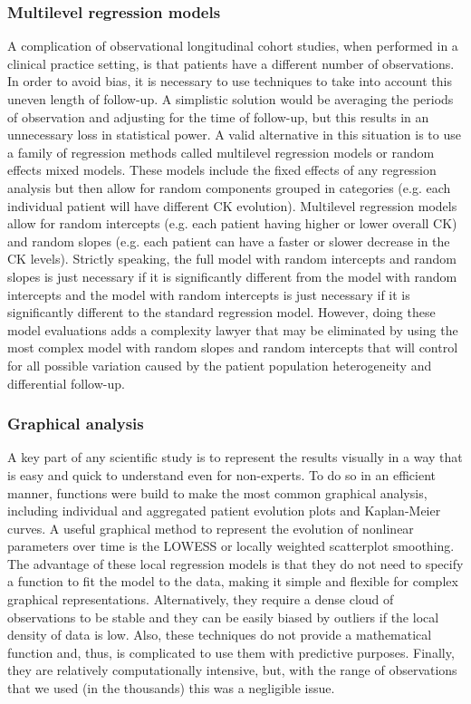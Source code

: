 \subsubsection{Multilevel regression models}
A complication of observational longitudinal cohort studies, when performed in a clinical practice setting, is that patients have a different number of observations. In order to avoid bias, it is necessary to use techniques to take into account this uneven length of follow-up. A simplistic solution would be averaging the periods of observation and adjusting for the time of follow-up, but this results in an unnecessary loss in statistical power. A valid alternative in this situation is to use a family of regression methods called multilevel regression models or random effects mixed models. These models include the fixed effects of any regression analysis but then allow for random components grouped in categories (e.g. each individual patient will have different CK evolution). Multilevel regression models allow for random intercepts (e.g. each patient having higher or lower overall CK) and random slopes (e.g. each patient can have a faster or slower decrease in the CK levels). Strictly speaking, the full model with random intercepts and random slopes is just necessary if it is significantly different from the model with random intercepts and the model with random intercepts is just necessary if it is significantly different to the standard regression model. However, doing these model evaluations adds a complexity lawyer that may be eliminated by using the most complex model with random slopes and random intercepts that will control for all possible variation caused by the patient population heterogeneity and differential follow-up.

\subsubsection{Graphical analysis}
A key part of any scientific study is to represent the results visually in a way that is easy and quick to understand even for non-experts. To do so in an efficient manner, functions were build to make the most common graphical analysis, including individual and aggregated patient evolution plots and Kaplan-Meier curves. A useful graphical method to represent the evolution of nonlinear parameters over time is the LOWESS or locally weighted scatterplot smoothing. The advantage of these local regression models is that they do not need to specify a function to fit the model to the data, making it simple and flexible for complex graphical representations. Alternatively, they require a dense cloud of observations to be stable and they can be easily biased by outliers if the local density of data is low. Also, these techniques do not provide a mathematical function and, thus, is complicated to use them with predictive purposes. Finally, they are relatively computationally intensive, but, with the range of observations that we used (in the thousands) this was a negligible issue.

